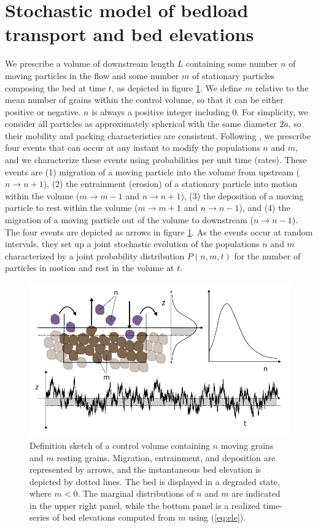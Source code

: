 \section{Stochastic model of bedload transport and bed elevations}
\label{sec:model}

We prescribe a volume of downstream length $L$ containing some number $n$ of moving particles in the flow and some number $m$ of stationary particles composing the bed at time $t$, as depicted in figure \ref{fig:definition}. We define $m$ relative to the mean number of grains within the control volume, so that it can be either positive or negative. $n$ is always a positive integer including $0$.
For simplicity, we consider all particles as approximately spherical with the same diameter $2a$, so their mobility and packing characteristics are consistent.
Following \citet{Ancey2008}, we prescribe four events that can occur at any instant to modify the populations $n$ and $m$, and we characterize these events using probabilities per unit time (rates).
These events are (1) migration of a moving particle into the volume from upstream ($n \rightarrow n+1$), (2) the entrainment (erosion) of a stationary particle into motion within the volume ($m\rightarrow m-1$ and $n\rightarrow n+1$), (3) the deposition of a moving particle to rest within the volume ($m\rightarrow m+1$ and $n\rightarrow n-1$), and (4) the migration of a moving particle out of the volume to downstream ($n\rightarrow n-1$).
The four events are depicted as arrows in figure \ref{fig:definition}.
As the events occur at random intervals, they set up a joint stochastic evolution of the populations $n$ and $m$ characterized by a joint probability distribution $P(n,m,t)$ for the number of particles in motion and rest in the volume at $t$.
\begin{figure}[!htbp]
	\includegraphics[width=\linewidth,keepaspectratio]{./figures/ch3/definition-combo.pdf}
	\caption{Definition sketch of a control volume containing $n$ moving grains and $m$ resting grains. Migration, entrainment, and deposition are represented by arrows, and the instantaneous bed elevation is depicted by dotted lines. The bed is displayed in a degraded state, where $m<0$. The marginal distributions of $n$ and $m$ are indicated in the upper right panel, while the bottom panel is a realized time-series of bed elevations computed from $m$ using (\ref{eq:ele}).}
	\label{fig:definition}
\end{figure}
